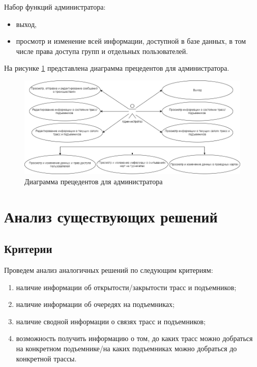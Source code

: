 	
	
\clearpage	
Набор функций администратора:
	\begin{itemize}
		\item выход,
		\item просмотр и изменение всей 
		информации, доступной в базе данных, в том числе права доступа групп и отдельных пользователей.
	\end{itemize}

На рисунке \ref{img:use_case4} представлена диаграмма прецедентов  для администратора.

\begin{figure}[h!]
	\begin{center}
		\includegraphics[scale=0.5]{../imgs/use_case/use-case4.png}
	\end{center}
	\captionsetup{justification=centering}
	\caption{Диаграмма прецедентов для администратора}
	\label{img:use_case4}
\end{figure}


\section{Анализ существующих решений}

\subsection{Критерии}\label{criteria}

Проведем анализ аналогичных решений по следующим критериям:
\begin{enumerate}
\item наличие информации об открытости/закрытости трасс и подъемников;
\item наличие информации об очередях на подъемниках; 
\item наличие сводной информации о связях трасс и подъемников;
\item возможность получить информацию о том, до каких трасс можно добраться на конкретном подъемнике/на каких подъемниках можно добраться до конкретной трассы.
\end{enumerate}

